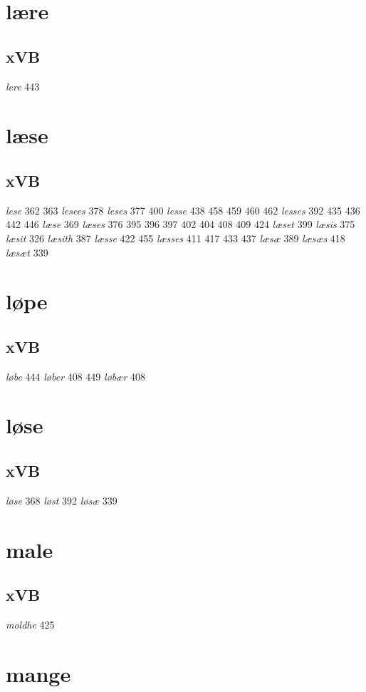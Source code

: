 \documentclass[a4paper,twocolumn]{article}
\begin{document}
\section{lære}
\label{sec:orgfcfcabc}
\subsection{xVB}
\label{sec:org67a3a72}
\emph{lere} 443 
\section{læse}
\label{sec:orgdc9ff05}
\subsection{xVB}
\label{sec:orgccedce1}
\emph{lese} 362 363 \emph{lesees} 378 \emph{leses} 377 400 \emph{lesse} 438 458 459 460 462 \emph{lesses} 392 435 436 442 446 \emph{læse} 369 \emph{læses} 376 395 396 397 402 404 408 409 424 \emph{læset} 399 \emph{læsis} 375 \emph{læsit} 326 \emph{læsith} 387 \emph{læsse} 422 455 \emph{læsses} 411 417 433 437 \emph{læsæ} 389 \emph{læsæs} 418 \emph{læsæt} 339 
\section{løpe}
\label{sec:orga94fb45}
\subsection{xVB}
\label{sec:org5024f41}
\emph{løbe} 444 \emph{løber} 408 449 \emph{løbær} 408 
\section{løse}
\label{sec:orgb69d36e}
\subsection{xVB}
\label{sec:org1e2f5a7}
\emph{løse} 368 \emph{løst} 392 \emph{løsæ} 339 
\section{male}
\label{sec:org84d7231}
\subsection{xVB}
\label{sec:org31b9b51}
\emph{moldhe} 425 
\section{mange}
\label{sec:org53b7cc6}
\end{document}
